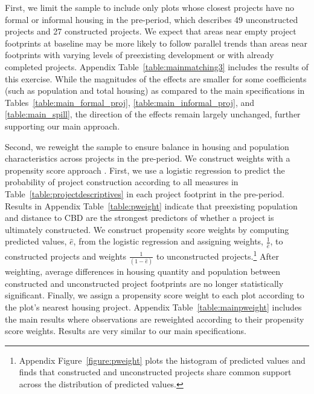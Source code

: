 \documentclass[12pt]{article}
\newcommand{\rv}{}
\begin{document}
First, we limit the sample to include only plots whose closest projects have no formal or informal housing in the pre-period, which describes 49 unconstructed projects and 27 constructed projects.  We expect that areas near empty project footprints at baseline may be more likely to follow parallel trends than areas near footprints with varying levels of preexisting development or with already completed projects.  Appendix Table~\ref{table:mainmatching3} includes the results of this exercise.  While the magnitudes of the effects are smaller for some coefficients (such as population and total housing) as compared to the main specifications in Tables~\ref{table:main_formal_proj}, \ref{table:main_informal_proj}, and \ref{table:main_spill}, the direction of the effects remain largely unchanged, further supporting our main approach.


Second, we reweight the sample to ensure balance in housing and population characteristics across projects in the pre-period.  We construct weights with a propensity score approach \citep{angrist2008mostly}.  First, we use a logistic regression to predict the probability of project construction according to \rv{all measures in Table~\ref{table:projectdescriptives} in each project footprint in the pre-period.}  Results in Appendix Table~\ref{table:pweight} indicate that preexisting \rv{population and distance to CBD are the strongest predictors} of whether a project is ultimately constructed.  We construct propensity score weights by computing predicted values, $\hat{e}$, from the logistic regression and assigning weights, $\frac{1}{\hat{e}}$, to constructed projects and weights $\frac{1}{(1-\hat{e})}$ to unconstructed projects.\footnote{Appendix Figure~\ref{figure:pweight} plots the histogram of predicted values and finds that constructed and unconstructed projects share common support across the distribution of predicted values.}  After weighting, average differences in housing quantity and population between constructed and unconstructed project footprints are no longer statistically significant.  Finally, we assign a propensity score weight to each plot according to the plot's nearest housing project.  Appendix Table~\ref{table:mainpweight} includes the main results where observations are reweighted according to their propensity score weights.  Results are very similar to our main specifications.
\end{document}
